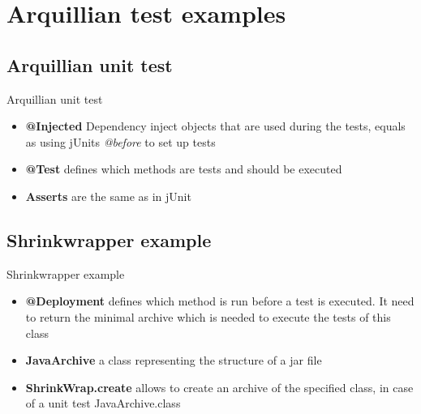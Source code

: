 \section[Examples]{Arquillian test examples}

\subsection[Unit test]{Arquillian unit test}
\begin{frame}{Arquillian unit test}
  
\begin{itemize}
	\item{ \textbf{@Injected} Dependency inject objects that are used during the tests, equals as using jUnits \textit{@before}  to set up tests}
	\item{ \textbf{@Test} defines which methods are tests and should be executed}
	\item{ \textbf{Asserts} are the same as in  jUnit}
\end{itemize}
\end{frame}

\subsection[Shrinkwrapper]{Shrinkwrapper example}
\begin{frame}{Shrinkwrapper example}
  

\begin{itemize}
	\item{\textbf{@Deployment} defines which method is run before a test is executed. It need to return the minimal archive which is needed to execute the tests of this class}
	\item{\textbf{JavaArchive} a class representing the structure of a jar file}
	\item{\textbf{ShrinkWrap.create} allows to create an archive of the specified class, in case of a unit test JavaArchive.class}
\end{itemize}
\end{frame}



